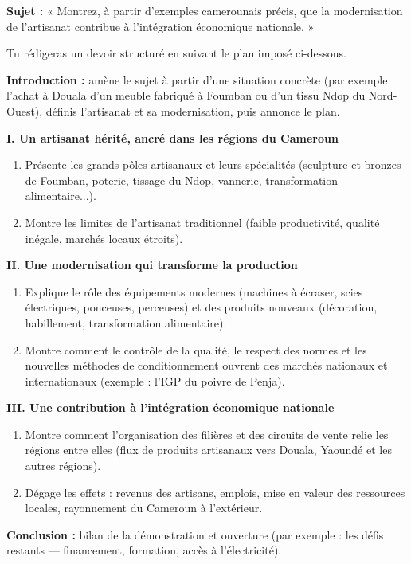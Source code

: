 \documentclass[11pt]{article}
\begin{document}
\begin{exercice}
\textbf{Sujet :} « Montrez, à partir d'exemples camerounais précis, que la modernisation de l'artisanat contribue à l'intégration économique nationale. »

Tu rédigeras un devoir structuré en suivant le plan imposé ci-dessous.

\textbf{Introduction :} amène le sujet à partir d'une situation concrète (par exemple l'achat à Douala d'un meuble fabriqué à Foumban ou d'un tissu Ndop du Nord-Ouest), définis l'artisanat et sa modernisation, puis annonce le plan.

\textbf{I. Un artisanat hérité, ancré dans les régions du Cameroun}
\begin{enumerate}
\item Présente les grands pôles artisanaux et leurs spécialités (sculpture et bronzes de Foumban, poterie, tissage du Ndop, vannerie, transformation alimentaire...).
\item Montre les limites de l'artisanat traditionnel (faible productivité, qualité inégale, marchés locaux étroits).
\end{enumerate}

\textbf{II. Une modernisation qui transforme la production}
\begin{enumerate}
\item Explique le rôle des équipements modernes (machines à écraser, scies électriques, ponceuses, perceuses) et des produits nouveaux (décoration, habillement, transformation alimentaire).
\item Montre comment le contrôle de la qualité, le respect des normes et les nouvelles méthodes de conditionnement ouvrent des marchés nationaux et internationaux (exemple : l'IGP du poivre de Penja).
\end{enumerate}

\textbf{III. Une contribution à l'intégration économique nationale}
\begin{enumerate}
\item Montre comment l'organisation des filières et des circuits de vente relie les régions entre elles (flux de produits artisanaux vers Douala, Yaoundé et les autres régions).
\item Dégage les effets : revenus des artisans, emplois, mise en valeur des ressources locales, rayonnement du Cameroun à l'extérieur.
\end{enumerate}

\textbf{Conclusion :} bilan de la démonstration et ouverture (par exemple : les défis restants — financement, formation, accès à l'électricité).
\end{exercice}
\end{document}
